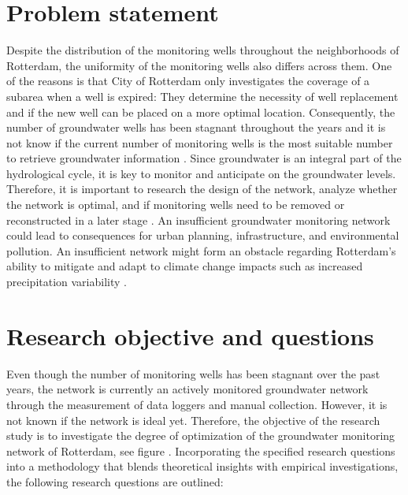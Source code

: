 \section{Problem statement}
Despite the distribution of the monitoring wells throughout the neighborhoods of Rotterdam, the uniformity of the monitoring wells also differs across them. One of the reasons is that City of Rotterdam only investigates the coverage of a subarea when a well is expired: They determine the necessity of well replacement and if the new well can be placed on a more optimal location. Consequently, the number of groundwater wells has been stagnant throughout the years and it is not know if the current number of monitoring wells is the most suitable number to retrieve groundwater information \cite{geul-2022}. Since groundwater is an integral part of the hydrological cycle, it is key to monitor and anticipate on the groundwater levels. Therefore, it is important to research the design of the network, analyze whether the network is optimal, and if monitoring wells need to be removed or reconstructed in a later stage \cite{european-environment-agency-2022}. An insufficient groundwater monitoring network could lead to consequences for urban planning, infrastructure, and environmental pollution. An insufficient network might form an obstacle regarding Rotterdam’s ability to mitigate and adapt to climate change impacts such as increased precipitation variability \cite{european-commission-2014}.

\newpage
\section{Research objective and questions}
Even though the number of monitoring wells has been stagnant over the past years, the network is currently an actively monitored groundwater network through the measurement of data loggers and manual collection. However, it is not known if the network is ideal yet. Therefore, the objective of the research study is to investigate the degree of optimization of the groundwater monitoring network of Rotterdam, see figure . Incorporating the specified research questions into a methodology that blends theoretical insights with empirical investigations, the following research questions are outlined:

